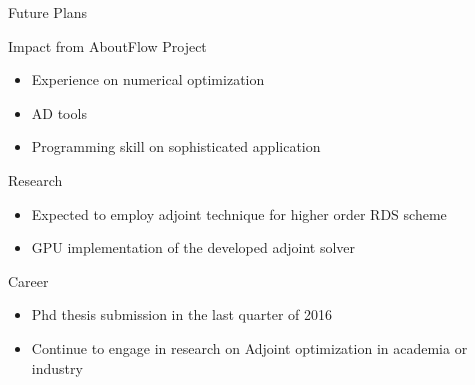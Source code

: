 \begin{frame}{Future Plans}
\begin{block}{Impact from AboutFlow Project}
\begin{itemize}
\item Experience on numerical optimization 
\item AD tools
\item Programming skill on sophisticated application
\end{itemize}
\end{block}
\begin{block}{Research}
\begin{itemize}
\item Expected to employ adjoint technique for higher order RDS scheme
\item GPU implementation of the developed adjoint solver
\end{itemize}
\end{block}
\begin{block}{Career}
\begin{itemize}
\item Phd thesis submission in the last quarter of 2016
\item Continue to engage in research on Adjoint optimization in academia or industry
\end{itemize}
\end{block}
\end{frame}




%

